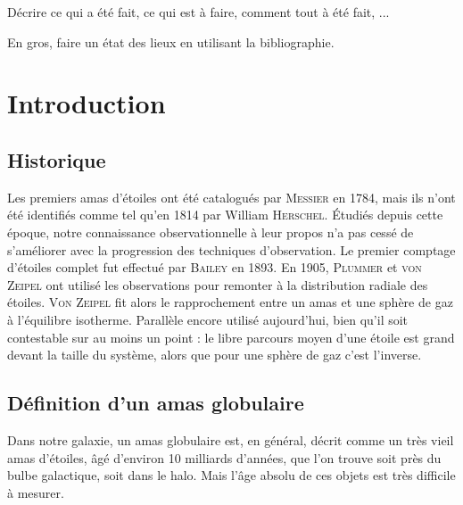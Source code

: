 Décrire ce qui a été fait, ce qui est à faire, comment tout à été fait, ...

En gros, faire un état des lieux en utilisant la bibliographie.
\normalsize

\chapter{Introduction}%
	\minitoc

\section{Historique}
Les premiers amas d'étoiles ont été catalogués par \textsc{Messier} en 1784, mais ils n'ont été identifiés comme tel qu'en 1814 par William \textsc{Herschel}. Étudiés depuis cette époque, notre connaissance
	observationnelle à leur propos n'a pas cessé de s'améliorer avec la progression des techniques d'observation.
	Le premier comptage d'étoiles complet fut effectué par \textsc{Bailey} en 1893. En 1905, \textsc{Plummer} et \textsc{von Zeipel}	ont utilisé les observations pour
	remonter à la distribution radiale des étoiles. \textsc{Von Zeipel} fit alors le rapprochement entre un amas et une sphère de gaz à l'équilibre isotherme.
	Parallèle encore utilisé aujourd'hui, bien qu'il soit contestable sur au moins un point : le libre parcours moyen d'une étoile est grand devant la taille du
	système, alors que pour une sphère de gaz c'est l'inverse.%

\section{Définition d'un amas globulaire}
	Dans notre galaxie, un amas globulaire est, en général, décrit comme un très vieil amas d'étoiles, âgé d'environ 10 milliards d'années, que l'on trouve soit près du bulbe galactique,
	soit dans le halo. Mais l'âge absolu de ces objets est très difficile à mesurer.

